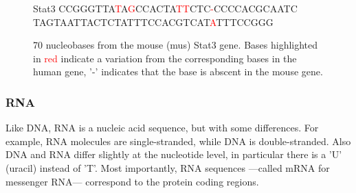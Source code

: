 \begin{figure}[ht]
  \centering
  \begin{SaveVerbatim}[commandchars=\\\{\},codes={\catcode`$=3\catcode`^=7\catcode`_=8}]{Stat3}
CCGGGTTA\textcolor{red}{T}A\textcolor{red}{G}CCACTA\textcolor{red}{TT}CTC\textcolor{red}{-}CCCCACGCAATC
TAGTAATTACTCTATTTCCACGTCAT\textcolor{red}{A}TTTCCGGG
\end{SaveVerbatim}
  \caption[70 nucleobases from the mouse (mus) Stat3 gene.]{70 nucleobases from the mouse (mus) Stat3 gene. Bases highlighted in \textcolor{red}{red} indicate a variation from the corresponding bases in the human gene, '-' indicates that the base is abscent in the mouse gene.}
\end{figure}



\subsubsection{RNA}

Like DNA, RNA is a nucleic acid sequence, but with some differences. For example, RNA molecules are single-stranded, while DNA is double-stranded. Also DNA and RNA differ slightly at the nucleotide level, in particular there is a 'U' (uracil) instead of 'T'. Most importantly, RNA sequences ---called mRNA for messenger RNA--- correspond to the protein coding regions. %

